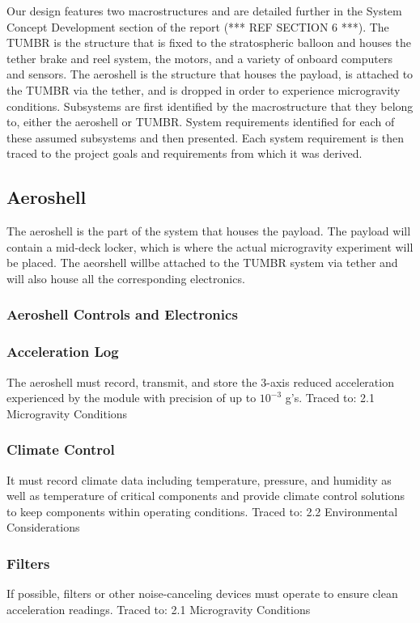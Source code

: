 \indent\indent Our design features two macrostructures and are detailed further in the System Concept Development section of the report (*** REF SECTION 6 ***). The TUMBR is the structure that is fixed to the stratospheric balloon and houses the tether brake and reel system, the motors, and a variety of onboard computers and sensors. The aeroshell is the structure that houses the payload, is attached to the TUMBR via the tether, and is dropped in order to experience microgravity conditions. Subsystems are first identified by the macrostructure that they belong to, either the aeroshell or TUMBR. System requirements identified for each of these assumed subsystems and then presented. Each system requirement is then traced to the project goals and requirements from which it was derived.

\subsection{Aeroshell}

\indent\indent The aeroshell is the part of the system that houses the payload. The payload will contain a mid-deck locker, which is where the actual microgravity experiment will be placed. The aeorshell willbe attached to the TUMBR system via tether and will also house all the corresponding electronics.

\subsubsection{Aeroshell Controls and Electronics}

\subsubsection*{Acceleration Log}
\indent\indent The aeroshell must record, transmit, and store the 3-axis reduced acceleration experienced by the module with precision of up to $10^{\minus3}$ g’s. Traced to: 2.1 Microgravity Conditions

\subsubsection*{Climate Control}
\indent\indent It must record climate data including temperature, pressure, and humidity as well as temperature of critical components and provide climate control solutions to keep components within operating conditions. Traced to: 2.2 Environmental Considerations

\subsubsection*{Filters}
\indent\indent If possible, filters or other noise-canceling devices must operate to ensure clean acceleration readings. Traced to: 2.1 Microgravity Conditions

